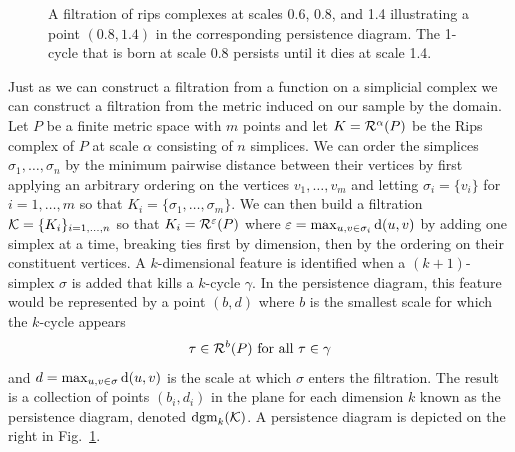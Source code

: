 \begin{figure}[htbp]
    \caption{A filtration of rips complexes at scales 0.6, 0.8, and 1.4 illustrating a point $(0.8, 1.4)$ in the corresponding persistence diagram. The 1-cycle that is born at scale 0.8 persists until it dies at scale 1.4.}
    \label{fig:persist}
\end{figure}



Just as we can construct a filtration from a function on a simplicial complex we can construct a filtration from the metric induced on our sample by the domain.
Let $P$ be a finite metric space with $m$ points and let $K = \mathcal{R}^\alpha(P)$ be the Rips complex of $P$ at scale $\alpha$ consisting of $n$ simplices.
We can order the simplices $\sigma_1,\ldots,\sigma_n$ by the minimum pairwise distance between their vertices by first applying an arbitrary ordering on the vertices $v_1,\ldots,v_m$ and letting $\sigma_i = \{v_i\}$ for $i=1,\ldots,m$ so that $K_i = \{\sigma_1,\ldots, \sigma_m\}$.
We can then build a filtration ${\mathcal{K}} = \{K_i\}_{i=1,\ldots,n}$ so that $K_i = \mathcal{R}^\varepsilon(P)$ where $\varepsilon = \max_{u,v\in\sigma_i}\mathrm{d}(u,v)$ by adding one simplex at a time, breaking ties first by dimension, then by the ordering on their constituent vertices.
A $k$-dimensional feature is identified when a $(k+1)$-simplex $\sigma$ is added that kills a $k$-cycle $\gamma$.
In the persistence diagram, this feature would be represented by a point $(b, d)$ where $b$ is the smallest scale for which the $k$-cycle appears
\[ \tau\in\mathcal{R}^b(P)\text{ for all }\tau\in\gamma\]
and $d = \max_{u,v\in\sigma}\mathrm{d}(u,v)$ is the scale at which $\sigma$ enters the filtration.
The result is a collection of points $(b_i, d_i)$ in the plane for each dimension $k$ known as the persistence diagram, denoted $\mathrm{dgm}_k({\mathcal{K}})$.
A persistence diagram is depicted on the right in Fig.~\ref{fig:persist}.

